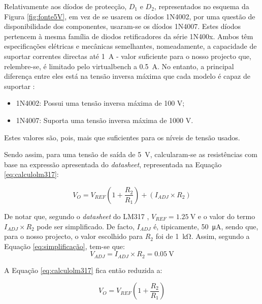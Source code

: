 Relativamente aos díodos de protecção, $D_{1}$ e $D_{2}$, representados no esquema da Figura \ref{fig:fonte5V}, em vez de se usarem os díodos 1N4002, por uma questão de disponibilidade dos componentes, usaram-se os díodos 1N4007. Estes díodos pertencem à mesma família de diodos retificadores da série 1N400x. Ambos têm especificações elétricas e mecânicas semelhantes, nomeadamente, a capacidade de suportar correntes directas até \SI{1}{\ampere} - valor suficiente para o nosso projecto que, relembre-se, é limitado pelo \acrshort{virtualbench} a \SI{0.5}{\ampere}. No entanto, a principal diferença entre eles está na tensão inversa máxima que cada modelo é capaz de suportar \cite{1N400x}:

\begin{itemize}
	\item 1N4002: Possui uma tensão inversa máxima de 100 V;
	\item 1N4007: Suporta uma tensão inversa máxima de 1000 V.
\end{itemize}

Estes valores são, pois, mais que suficientes para os níveis de tensão usados.

Sendo assim, para uma tensão de saída de \SI{5}{\volt}, calcularam-se as resistências com base na expressão apresentada do \textit{datasheet}, representada na Equação \ref{eq:calculolm317}: 

\begin{equation} \label{eq:calculolm317}
	V_{O} = V_{REF} (1 + \frac{R_{2}}{R_{1}}) + (I_{ADJ} \times R_{2})
\end{equation}

De notar que, segundo o \textit{datasheet} do LM317 \cite{LM317}, $V_{REF} = \SI{1.25}{\volt}$ e o valor do termo $I_{ADJ} \times R_{2}$ pode ser simplificado. De facto, $I_{ADJ}$ é, tipicamente, \SI{50}{\micro\ampere}, sendo que, para o nosso projecto, o valor escolhido para $R_{2}$ foi de \SI{1}{\kilo\ohm}. Assim, segundo a Equação \ref{eq:simplificação}, tem-se que:
\begin{equation} \label{eq:simplificação}
	V_{ADJ} = I_{ADJ} \times R_{2} = \SI{0.05}{\volt}
\end{equation}

A Equação \ref{eq:calculolm317} fica então reduzida a:

\begin{equation} \label{eq:calculoR1simplificado}
	V_{O} = V_{REF} (1 + \frac{R_{2}}{R_{1}})
\end{equation}

